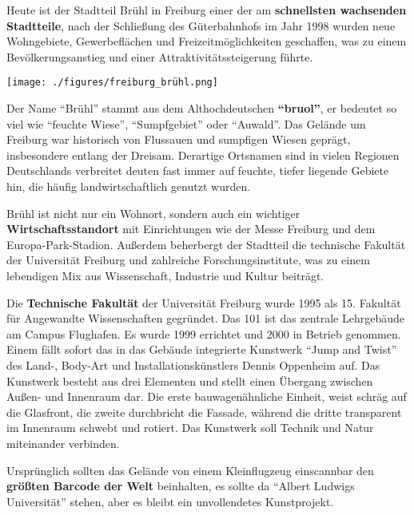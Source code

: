 \documentclass[landscape, a4paper]{article}
\newcommand\alert[1]{\textcolor{PrimaryColor}{\textbf{#1}}}
\begin{document}
\begin{minipage}[t]{0.32\textwidth}
	\vspace{0cm}
	\setlength{\parskip}{0.25cm}

	Heute ist der Stadtteil Brühl in Freiburg einer der am \alert{schnellsten wachsenden Stadtteile}, nach der Schließung des Güterbahnhofs im Jahr 1998 wurden neue Wohngebiete, Gewerbeflächen und Freizeitmöglichkeiten geschaffen, was zu einem Bevölkerungsanstieg und einer Attraktivitätssteigerung führte.

	\texttt{[image: ./figures/freiburg\_brühl.png]}
	\setlength{\parskip}{0.25cm}

	Der Name \enquote{Brühl} stammt aus dem Althochdeutschen \alert{\enquote{bruol}}, er bedeutet so viel wie \enquote{feuchte Wiese}, \enquote{Sumpfgebiet} oder \enquote{Auwald}. Das Gelände um Freiburg war historisch von Flussauen und sumpfigen Wiesen geprägt, insbesondere entlang der Dreisam. Derartige Ortsnamen sind in vielen Regionen Deutschlands verbreitet deuten fast immer auf feuchte, tiefer liegende Gebiete hin, die häufig landwirtschaftlich genutzt wurden.

	Brühl ist nicht nur ein Wohnort, sondern auch ein wichtiger \alert{Wirtschaftsstandort} mit Einrichtungen wie der Messe Freiburg und dem Europa-Park-Stadion. Außerdem beherbergt der Stadtteil die technische Fakultät der Universität Freiburg und zahlreiche Forschungsinstitute, was zu einem lebendigen Mix aus Wissenschaft, Industrie und Kultur beiträgt.

  Die \alert{Technische Fakultät} der Universität Freiburg wurde 1995 als 15. Fakultät für Angewandte Wissenschaften gegründet. Das 101 ist das zentrale Lehrgebäude am Campus Flughafen. Es wurde 1999 errichtet und 2000 in Betrieb genommen. Einem fällt sofort das in das Gebäude integrierte Kunstwerk \enquote{Jump and Twist} des Land-, Body-Art und Installationskünstlers Dennis Oppenheim auf. Das Kunstwerk besteht aus drei Elementen und stellt einen Übergang zwischen Außen- und Innenraum dar. Die erste bauwagenähnliche Einheit, weist schräg auf die Glasfront, die zweite durchbricht die Fassade, während die dritte transparent im Innenraum schwebt und rotiert. Das Kunstwerk soll Technik und Natur miteinander verbinden.

  Ursprünglich sollten das Gelände von einem Kleinflugzeug einscannbar den \alert{größten Barcode der Welt} beinhalten, es sollte da \enquote{Albert Ludwigs Universität} stehen, aber es bleibt ein unvollendetes Kunstprojekt.
\end{minipage}
\end{document}
